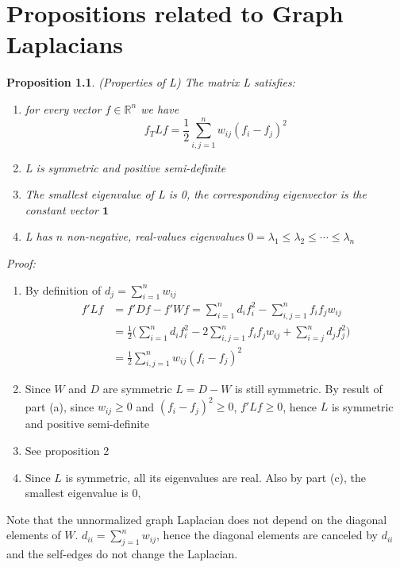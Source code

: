 \documentclass[10pt,a4paper, nocenter]{report}
\newtheorem{prop}{Proposition}
\begin{document}
    \chapter{Propositions related to Graph Laplacians}
    \begin{prop}(Properties of L) The matrix L satisfies:
        \begin{enumerate}
            \item for every vector $f \in \mathbb{R}^{n}$ we have $$ f_{T}Lf = \frac{1}{2}\sum_{i,j=1}^{n} w_{ij}(f_{i}-f_{j})^{2} $$
            \item L is symmetric and positive semi-definite
            \item The smallest eigenvalue of L is 0, the corresponding eigenvector is the constant vector $\mathbf{1}$
            \item L has $n$ non-negative, real-values eigenvalues $0=\lambda_{1} \le \lambda_{2} \le \cdots \le \lambda_{n}$
        \end{enumerate}
    \end{prop}
    \textit{Proof:}
    \begin{enumerate}
        \item  By definition of $d_{j} = \sum_{i=1}^{n}w_{ij}$
        \begin{align*}
        f'Lf & = f'Df - f'Wf = \sum_{i=1}^{n}d_{i}f_{i}^{2} -  \sum_{i,j=1}^{n}f_{i}f_{j}w_{ij}\\
        & = \frac{1}{2}\bigg(\sum_{i=1}^{n}d_{i}f_{i}^{2} -  2\sum_{i,j=1}^{n}f_{i}f_{j}w_{ij} + \sum_{i=j}^{n}d_{j}f_{j}^{2}\bigg)\\
        & = \frac{1}{2}\sum_{i,j=1}^{n}w_{ij}(f_{i}-f_{j})^{2}
        \end{align*}
        \item Since $W$ and $D$ are symmetric $L = D-W$ is still symmetric. By result of part (a), since $w_{ij} \ge 0$ and $(f_{i}-f_{j})^{2} \ge 0$, $f'Lf \ge 0$, hence $L$ is symmetric and positive semi-definite
        \item See proposition 2
        \item Since $L$ is symmetric, all its eigenvalues are real. Also by part (c), the smallest eigenvalue is 0, 
    \end{enumerate}

    Note that the unnormalized graph Laplacian does not depend on the diagonal elements of $W$. $d_{ii} = \sum_{j=1}^{n}w_{ij}$, hence the diagonal elements are canceled by $d_{ii}$ and the self-edges do not change the Laplacian. \\
    
\end{document}
